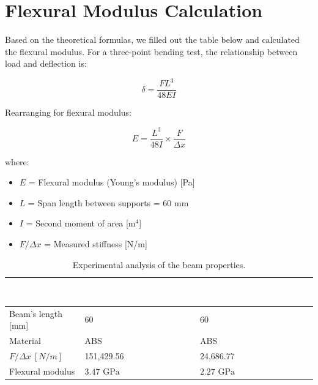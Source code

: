 \documentclass[12pt, a4paper]{article}
\begin{document}
\section{Flexural Modulus Calculation}
Based on the theoretical formulas, we filled out the table below and calculated the flexural modulus. 
\vspace{0.1cm}
For a three-point bending test, the relationship between load and deflection is:

\begin{equation}
\delta = \frac{FL^3}{48EI}
\end{equation}

Rearranging for flexural modulus:

\begin{equation}
\boxed{E = \frac{L^3}{48I} \times \frac{F}{\Delta x}}
\end{equation}

where:
\begin{itemize}
    \item $E$ = Flexural modulus (Young's modulus) [Pa]
    \item $L$ = Span length between supports = 60 mm
    \item $I$ = Second moment of area [m$^4$]
    \item $F/\Delta x$ = Measured stiffness [N/m]
\end{itemize}

\begin{table}[H]
\centering
\noindent
{}

\begin{tabular}{p{4cm} p{5cm} p{5cm}}

\rowcolor{MainBlue}
\textcolor{white}{\textbf{Properties}} &
\textcolor{white}{\textbf{I-beam (bending about the $z$ axis)}} &
\textcolor{white}{\textbf{H-beam (bending about the $y$ axis)}} \\

\midrule

Beam's length [mm] & 60 & 60 \\

Material & ABS & ABS \\

$F/\Delta x \ [N/m]$ & 151,429.56 & 24,686.77 \\

Flexural modulus & $3.47\text{ GPa}$ & $2.27\text{ GPa}$ \\

\bottomrule
\end{tabular}

\caption{Experimental analysis of the beam properties.}
\end{table}
\end{document}
